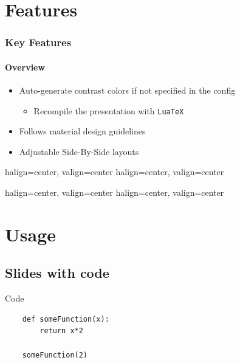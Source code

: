 \documentclass[lualatex]{beamer}
\begin{document}
\section{Features}
\begin{frame}
	\frametitle{Key Features}
	\framesubtitle{Overview}

	\begin{itemize}
		\item Auto-generate contrast colors if not specified in the config
		\begin{itemize}
			\item Recompile the presentation with \texttt{LuaTeX}
		\end{itemize}
		\item Follows material design guidelines
		\item Adjustable Side-By-Side layouts
	\end{itemize}
\end{frame}

\begin{frame}
	{halign=center, valign=center}
	{halign=center, valign=center}
\end{frame}

\begin{frame}
	{halign=center, valign=center}
	{halign=center, valign=center}
\end{frame}


\section{Usage}
\subsection{Slides with code}
\begin{frame}[fragile=singleslide]{Code}
	\begin{lstlisting}
	def someFunction(x):
		return x*2

	someFunction(2)
	\end{lstlisting}
\end{frame}
\end{document}
